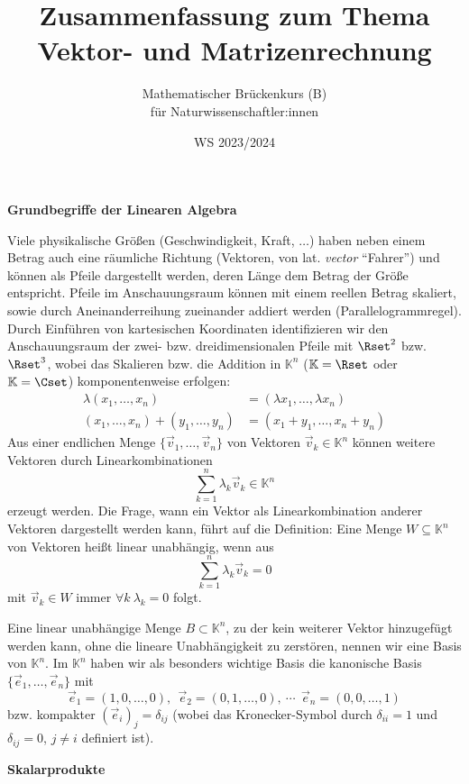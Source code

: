 \documentclass[a4paper,10pt]{article}
\title{Zusammenfassung zum Thema \\ Vektor- und Matrizenrechnung}
\author{Mathematischer Brückenkurs (B)\\für Naturwissenschaftler:innen}
\date{WS 2023/2024}
\begin{document}
\parindent0pt
\maketitle

{\bf Grundbegriffe der Linearen Algebra}

Viele physikalische Größen (Geschwindigkeit, Kraft, $\ldots$) haben neben
einem Betrag auch eine räumliche Richtung
(Vektoren, von lat. {\em vector} ``Fahrer'')
und können als Pfeile dargestellt werden,
deren Länge dem Betrag der Größe entspricht.
Pfeile im Anschauungsraum können mit einem reellen Betrag skaliert, sowie
durch Aneinanderreihung zueinander addiert werden (Parallelogrammregel).
Durch Einführen von kartesischen Koordinaten identifizieren wir den
Anschauungsraum der zwei- bzw. dreidimensionalen Pfeile mit
$\Rset^2$ bzw. $\Rset^3$,
wobei das Skalieren bzw. die Addition in $\mathbb{K}^n$ ($\mathbb{K}=\Rset$
oder $\mathbb{K}=\Cset$) komponentenweise erfolgen:
\begin{align*}
\lambda (x_1,\ldots,x_n) &= (\lambda x_1,\ldots,\lambda x_n) \\
(x_1,\ldots,x_n) + (y_1,\ldots,y_n) &= (x_1+y_1,\ldots,x_n+y_n)
\end{align*}
Aus einer endlichen Menge $\{\vec{v}_1,\ldots,\vec{v}_n\}$ von
Vektoren $\vec{v}_k\in \mathbb{K}^n$
können weitere Vektoren durch Linearkombinationen
\[
\sum_{k=1}^n \lambda_k \vec{v}_k \in \mathbb{K}^n
\]
erzeugt werden.
Die Frage, wann ein Vektor als Linearkombination anderer Vektoren
dargestellt werden kann, führt auf die Definition: Eine Menge $W\subseteq
\mathbb{K}^n$
von Vektoren heißt linear unabhängig, wenn aus
\[
\sum_{k=1}^n \lambda_k \vec{v}_k = 0
\]
mit $\vec{v}_k\in W$ immer $\forall k~\lambda_k=0$ folgt.

Eine linear unabhängige Menge $B\subset \mathbb{K}^n$, zu der kein weiterer Vektor
hinzugefügt werden kann, ohne die lineare Unabhängigkeit zu zerstören,
nennen wir eine Basis von $\mathbb{K}^n$.
Im $\mathbb{K}^n$ haben wir als besonders wichtige Basis die kanonische
Basis $\{\vec{e}_1,\ldots,\vec{e}_n\}$ mit
\[
\vec{e}_1=(1,0,\ldots,0),~~
\vec{e}_2=(0,1,\ldots,0),~
\cdots~~\vec{e}_n=(0,0,\ldots,1)
\]
bzw. kompakter $(\vec{e}_i)_j=\delta_{ij}$
(wobei das Kronecker-Symbol durch $\delta_{ii}=1$ und $\delta_{ij}=0$,
$j\not=i$ definiert ist).\\

\pagebreak

{\bf Skalarprodukte}
\end{document}
